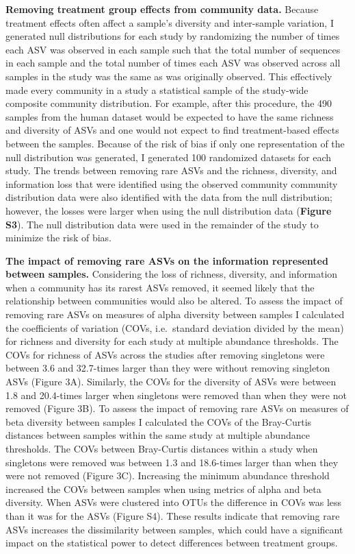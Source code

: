 \documentclass[]{article}
\begin{document}
\textbf{Removing treatment group effects from community data.} Because
treatment effects often affect a sample's diversity and inter-sample
variation, I generated null distributions for each study by randomizing
the number of times each ASV was observed in each sample such that the
total number of sequences in each sample and the total number of times
each ASV was observed across all samples in the study was the same as
was originally observed. This effectively made every community in a
study a statistical sample of the study-wide composite community
distribution. For example, after this procedure, the 490 samples from
the human dataset would be expected to have the same richness and
diversity of ASVs and one would not expect to find treatment-based
effects between the samples. Because of the risk of bias if only one
representation of the null distribution was generated, I generated 100
randomized datasets for each study. The trends between removing rare
ASVs and the richness, diversity, and information loss that were
identified using the observed community community distribution data were
also identified with the data from the null distribution; however, the
losses were larger when using the null distribution data (\textbf{Figure
S3}). The null distribution data were used in the remainder of the study
to minimize the risk of bias.

\textbf{The impact of removing rare ASVs on the information represented
between samples.} Considering the loss of richness, diversity, and
information when a community has its rarest ASVs removed, it seemed
likely that the relationship between communities would also be altered.
To assess the impact of removing rare ASVs on measures of alpha
diversity between samples I calculated the coefficients of variation
(COVs, i.e.~standard deviation divided by the mean) for richness and
diversity for each study at multiple abundance thresholds. The COVs for
richness of ASVs across the studies after removing singletons were
between 3.6 and 32.7-times larger than they were without removing
singleton ASVs (Figure 3A). Similarly, the COVs for the diversity of
ASVs were between 1.8 and 20.4-times larger when singletons were removed
than when they were not removed (Figure 3B). To assess the impact of
removing rare ASVs on measures of beta diversity between samples I
calculated the COVs of the Bray-Curtis distances between samples within
the same study at multiple abundance thresholds. The COVs between
Bray-Curtis distances within a study when singletons were removed was
between 1.3 and 18.6-times larger than when they were not removed
(Figure 3C). Increasing the minimum abundance threshold increased the
COVs between samples when using metrics of alpha and beta diversity.
When ASVs were clustered into OTUs the difference in COVs was less than
it was for the ASVs (Figure S4). These results indicate that removing
rare ASVs increases the dissimilarity between samples, which could have
a significant impact on the statistical power to detect differences
between treatment groups.
\end{document}
